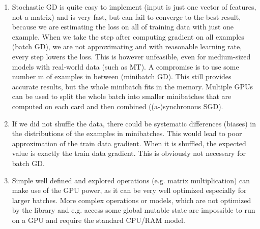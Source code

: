 \begin{exercise}

\begin{enumerate}
    \item
Stochastic GD is quite easy to implement (input is just one vector of features, not a matrix) and is very fast, but can fail to converge to the best result, because we are estimating the loss on all of training data with just one example.
When we take the step after computing gradient on all examples (batch GD), we are not approximating and with reasonable learning rate, every step lowers the loss. This is however unfeasible, even for medium-sized models with real-world data (such as MT). A compromise is to use some number m of examples in between (minibatch GD). This still provides accurate results, but the whole minibatch fits in the memory. Multiple GPUs can be used to split the whole batch into smaller minibatches that are computed on each card and then combined ((a-)synchronous SGD).

\item
If we did not shuffle the data, there could be systematic differences (biases) in the distributions of the examples in minibatches. This would lead to poor approximation of the train data gradient. When it is shuffled, the expected value is exactly the train data gradient. This is obviously not necessary for batch GD.

\item
Simple well defined and explored operations (e.g. matrix multiplication) can make use of the GPU power, as it can be very well optimized especially for larger batches. More complex operations or models, which are not optimized by the library and e.g. access some global mutable state are impossible to run on a GPU and require the standard CPU/RAM model. 
\end{enumerate}

\end{exercise}

